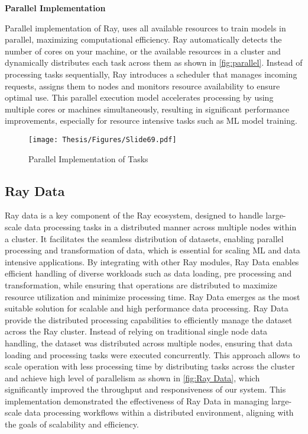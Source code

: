 \textbf{Parallel Implementation}

Parallel implementation of Ray, uses all available resources to train models in parallel, maximizing computational efficiency. Ray automatically detects the number of cores on your machine, or the available resources in a cluster and dynamically distributes each task across them as shown in \autoref{fig:parallel}. Instead of processing tasks sequentially, Ray introduces a scheduler that manages incoming requests, assigns them to nodes and monitors resource availability to ensure optimal use. This parallel execution model accelerates processing by using multiple cores or machines simultaneously, resulting in significant performance improvements, especially for resource intensive tasks such as ML model training. \cite{ray_doc}

\clearpage

\begin{figure}[h]
\centering
\texttt{[image: Thesis/Figures/Slide69.pdf]}
\caption{\label{fig:parallel}Parallel Implementation of Tasks \cite{ray_doc}}
\end{figure}

\subsection{Ray Data}

Ray data is a key component of the Ray ecosystem, designed to handle large-scale data processing tasks in a distributed manner across multiple nodes within a cluster. It facilitates the seamless distribution of datasets, enabling parallel processing and transformation of data, which is essential for scaling ML and data intensive applications. By integrating with other Ray modules, Ray Data enables efficient handling of diverse workloads such as data loading, pre processing and transformation, while ensuring that operations are distributed to maximize resource utilization and minimize processing time. Ray Data emerges as the most suitable solution for scalable and high performance data processing. Ray Data provide the distributed processing capabilities to efficiently manage the dataset across the Ray cluster. Instead of relying on traditional single node data handling, the dataset was distributed across multiple nodes, ensuring that data loading and processing tasks were executed concurrently. This approach allows to scale operation with less processing time by distributing tasks across the cluster and achieve high level of parallelism as shown in \autoref{fig:Ray Data}, which significantly improved the throughput and responsiveness of our system. This implementation demonstrated the effectiveness of Ray Data in managing large-scale data processing workflows within a distributed environment, aligning with the goals of scalability and efficiency. \cite{ray_doc}

